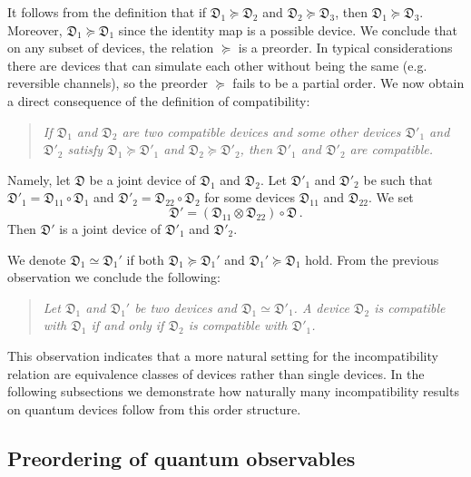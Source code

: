 \documentclass[12pt]{article}
\theoremstyle{definition}
\newcommand{\Dev}{\mathfrak{D}} %
\newcommand{\pgeq}{\succeq}
\begin{document}
{It follows from the definition that if $\Dev_1 \pgeq \Dev_2$ and $\Dev_2 \pgeq \Dev_3$, then $\Dev_1 \pgeq \Dev_3$.
Moreover, $\Dev_1 \pgeq \Dev_1$ since the identity map is a possible device. 
We conclude that on any subset of devices, the relation $\pgeq$ is a preorder.
In typical considerations there are devices that can simulate each other without being the same (e.g. reversible channels), so the preorder $\pgeq$ fails to be a partial order.
We now obtain a direct consequence of the definition of compatibility:
\begin{quote}
\emph{If $\Dev_1$ and $\Dev_2$ are two compatible devices and some other devices $\Dev'_1$ and $\Dev'_2$ satisfy
$\Dev_1 \pgeq \Dev'_1$ and $\Dev_2
\pgeq \Dev'_2$, then $\Dev'_1$ and $\Dev'_2$  are compatible.}
\end{quote}
Namely, let $\Dev$ be a joint device of $\Dev_1$ and $\Dev_2$.
Let $\Dev'_1$ and $\Dev'_2$ be such that
$\Dev'_1 = \Dev_{11} \circ \Dev_1$ and $\Dev'_2 = \Dev_{22} \circ \Dev_2$ for some devices $\Dev_{11}$ and $\Dev_{22}$.
We set
\begin{equation}
\Dev' = (\Dev_{11} \otimes \Dev_{22}) \circ \Dev \, . 
\end{equation}
Then $\Dev'$ is a joint device of $\Dev'_1$ and $\Dev'_2$.


We denote $\Dev_1\simeq \Dev_1'$ if both $\Dev_1 \pgeq \Dev_1'$ and $\Dev_1'\pgeq \Dev_1$ hold. 
From the previous observation we conclude the following:
\begin{quote}
\emph{Let $\Dev_1$ and $\Dev_1'$ be two devices and $\Dev_1 \simeq \Dev'_1$.
A device $\Dev_2$ is compatible with $\Dev_1$ if and only if $\Dev_2$ is compatible with $\Dev'_1$.}
\end{quote}
This observation indicates that a more natural setting for the incompatibility relation are equivalence classes of devices rather than single devices.
In the following subsections we demonstrate how naturally many incompatibility results on quantum devices follow from this order structure.

\subsection{Preordering of quantum observables}

}
\end{document}
